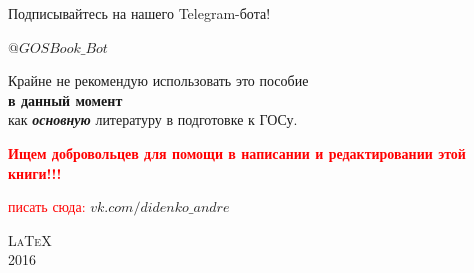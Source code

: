 \mbox{}

\textcolor{PersianBlue}{\huge \textsf{Подписывайтесь на нашего Telegram-бота!\footnotemark}} 

\vspace*{0.5\baselineskip} 

\href{https://t.me/GOSBook_Bot}{\textcolor{Purplemountainmajesty}{$@GOSBook\_Bot$}}

\mbox{}

Крайне не рекомендую использовать это пособие\\ {\textbf{в данный момент}} \\как \textit{\textbf{основную}} литературу в подготовке к ГОСу. \\

\mbox{}

\textcolor{red}{\Large \textbf{
Ищем добровольцев для помощи в написании и редактировании этой книги!!!}}

\vspace*{0.3\baselineskip} 

\textcolor{red}{
писать сюда: \href{https://vk.com/didenko_andre}{ \textcolor{Purplemountainmajesty}{$vk.com/didenko\_andre$}}
}

\mbox{}

\vfill
{\LARGE\scshape \LaTeX}\\[\baselineskip]
{\LARGE\scshape 2016}\par
\restoregeometry
\endgroup
\newpage